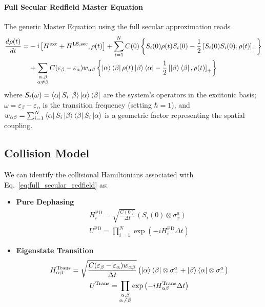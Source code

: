 \documentclass[a4paper,12pt]{article}
\begin{document}
\paragraph{Full Secular Redfield Master Equation}
The generic Master Equation using the full secular approximation reads
\begin{align}
	\frac{d \rho(t)}{dt} = & -\text{i} \left[ H^{\text{exc}} + H^{\text{LS,sec}}, \rho(t) \right] + \sum_{i=1}^{N} C(0) \left\{ S_i(0)\rho(t)S_i(0) - \frac{1}{2} \left[ S_i(0)S_i(0), \rho(t) \right]_+ \right\} \notag \\
	& + \sum_{\substack{\alpha, \beta \\ \alpha \neq \beta}} C(\varepsilon_\beta - \varepsilon_\alpha) w_{\alpha\beta} \left\{ \Ket{\alpha}\Bra{\beta}\rho(t)\Ket{\beta}\Bra{\alpha} - \frac{1}{2} \left[ \Ket{\beta}\Bra{\beta}, \rho(t) \right]_+ \right\} \label{eq:full_secular_redfield}
\end{align}
where $S_{i}(\omega) = \Bra{\alpha}S_{i}\Ket{\beta}\Ket{\alpha}\Bra{\beta}$ are the system's operators in the excitonic basis; $\omega = \varepsilon_{\beta} - \varepsilon_{\alpha}$ is the transition frequency (setting $\hbar = 1$), and $w_{\alpha\beta} = \sum_{i=1}^{N} \Bra{\alpha}S_{i}\Ket{\beta}\Bra{\beta}S_{i}\Ket{\alpha}$ is a geometric factor representing the spatial coupling.

\subsection{Collision Model}

We can identify the collisional Hamiltonians associated with Eq.~\eqref{eq:full_secular_redfield} as:
\begin{itemize}
	\item \textbf{Pure Dephasing} 
	\begin{gather*}
		H_{i}^{\text{PD}} = \sqrt{\frac{C(0)}{\Delta t}} \left( S_{i}(0) \otimes \sigma_{x}^{a} \right) \\
		U^{\text{PD}} = \prod_{i=1}^{N} \exp \left( -i H_{i}^{\text{PD}} \Delta t \right)
	\end{gather*} 
	\item \textbf{Eigenstate Transition} 
	\begin{gather*}
		H_{\alpha\beta}^{\text{Trans}} = \sqrt{\frac{C(\varepsilon_{\beta} - \varepsilon_{\alpha}) w_{\alpha\beta}}{\Delta t}} \left( \Ket{\alpha}\Bra{\beta} \otimes \sigma_{+}^{a} + \Ket{\beta}\Bra{\alpha} \otimes \sigma_{-}^{a} \right) \\ 
		U^{\text{Trans}} = \prod_{\substack{\alpha,\beta \\ \alpha \neq \beta}} \exp \left( -i H_{\alpha\beta}^{\text{Trans}} \Delta t \right)
	\end{gather*} 
\end{itemize}
\end{document}
